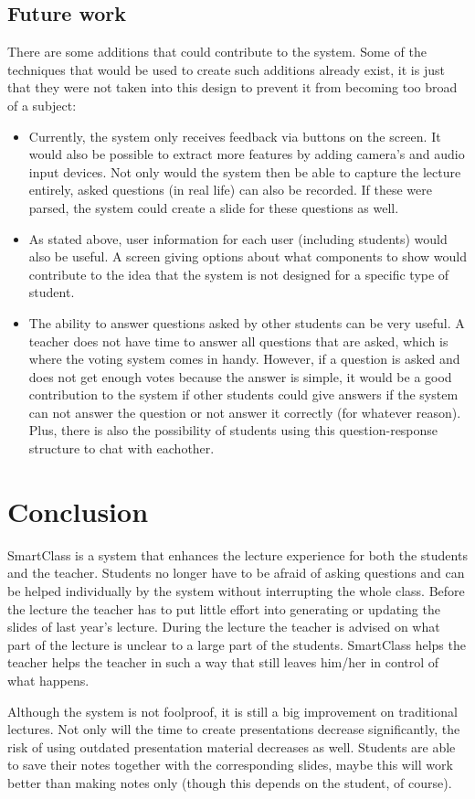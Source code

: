 \documentclass[11pt]{article}
\begin{document}
\subsection{Future work}
There are some additions that could contribute to the system. Some of the techniques that would be used to create such additions already exist, it is just that they were not taken into this design to prevent it from becoming too broad of a subject:
\begin{itemize}
\item 
Currently, the system only receives feedback via buttons on the screen. It would also be possible to extract more features by adding camera's and audio input devices. Not only would the system then be able to capture the lecture entirely, asked questions (in real life) can also be recorded. If these were parsed, the system could create a slide for these questions as well. 
\item
As stated above, user information for each user (including students) would also be useful. A screen giving options about what components to show would contribute to the idea that the system is not designed for a specific type of student.
\item 
The ability to answer questions asked by other students can be very useful. A teacher does not have time to answer all questions that are asked, which is where the voting system comes in handy. However, if a question is asked and does not get enough votes because the answer is simple, it would be a good contribution to the system if other students could give answers if the system can not answer the question or not answer it correctly (for whatever reason). Plus, there is also the possibility of students using this question-response structure to chat with eachother. 
\end{itemize}

\section{Conclusion}
SmartClass is a system that enhances the lecture experience for both the students and the teacher. Students no longer have to be afraid of asking questions and can be helped individually by the system without interrupting the whole class. Before the lecture the teacher has to put little effort into generating or updating the slides of last year's lecture. During the lecture the teacher is advised on what part of the lecture is unclear to a large part of the students. SmartClass helps the teacher helps the teacher in such a way that still leaves him/her in control of what happens. 

Although the system is not foolproof, it is still a big improvement on traditional lectures. Not only will the time to create presentations decrease significantly, the risk of using outdated presentation material decreases as well. Students are able to save their notes together with the corresponding slides, maybe this will work better than making notes only (though this depends on the student, of course). 
\end{document}
